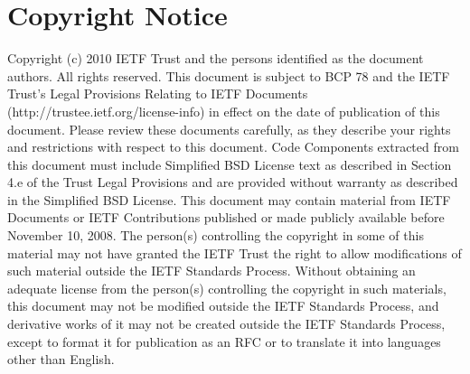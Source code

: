 \section*{Copyright Notice}

Copyright (c) 2010 IETF Trust and the persons identified as the
document authors. All rights reserved.
This document is subject to BCP 78 and the IETF Trust’s Legal
Provisions Relating to IETF Documents \\
(http://trustee.ietf.org/license-info) in effect on the date of
publication of this document. Please review these documents
carefully, as they describe your rights and restrictions with respect
to this document. Code Components extracted from this document must
include Simplified BSD License text as described in Section 4.e of
the Trust Legal Provisions and are provided without warranty as
described in the Simplified BSD License.
This document may contain material from IETF Documents or IETF
Contributions published or made publicly available before November
10, 2008. The person(s) controlling the copyright in some of this
material may not have granted the IETF Trust the right to allow
modifications of such material outside the IETF Standards Process.
Without obtaining an adequate license from the person(s) controlling
the copyright in such materials, this document may not be modified
outside the IETF Standards Process, and derivative works of it may
not be created outside the IETF Standards Process, except to format
it for publication as an RFC or to translate it into languages other
than English.

